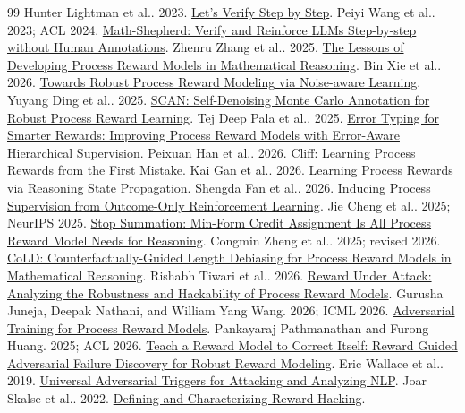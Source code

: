 \begin{thebibliography}{99}
\small
{} Hunter Lightman et al.. 2023. \href{https://arxiv.org/abs/2305.20050}{Let's Verify Step by Step}.
 Peiyi Wang et al.. 2023; ACL 2024. \href{https://arxiv.org/abs/2312.08935}{Math-Shepherd: Verify and Reinforce LLMs Step-by-step without Human Annotations}.
 Zhenru Zhang et al.. 2025. \href{https://arxiv.org/abs/2501.07301}{The Lessons of Developing Process Reward Models in Mathematical Reasoning}.
 Bin Xie et al.. 2026. \href{https://arxiv.org/abs/2601.12748}{Towards Robust Process Reward Modeling via Noise-aware Learning}.
 Yuyang Ding et al.. 2025. \href{https://arxiv.org/abs/2509.16548}{SCAN: Self-Denoising Monte Carlo Annotation for Robust Process Reward Learning}.
 Tej Deep Pala et al.. 2025. \href{https://arxiv.org/abs/2505.19706}{Error Typing for Smarter Rewards: Improving Process Reward Models with Error-Aware Hierarchical Supervision}.
 Peixuan Han et al.. 2026. \href{https://arxiv.org/abs/2609.02817}{Cliff: Learning Process Rewards from the First Mistake}.
 Kai Gan et al.. 2026. \href{https://arxiv.org/abs/2609.39220}{Learning Process Rewards via Reasoning State Propagation}.
 Shengda Fan et al.. 2026. \href{https://arxiv.org/abs/2609.36641}{Inducing Process Supervision from Outcome-Only Reinforcement Learning}.
 Jie Cheng et al.. 2025; NeurIPS 2025. \href{https://arxiv.org/abs/2504.15275}{Stop Summation: Min-Form Credit Assignment Is All Process Reward Model Needs for Reasoning}.
 Congmin Zheng et al.. 2025; revised 2026. \href{https://arxiv.org/abs/2507.15698}{CoLD: Counterfactually-Guided Length Debiasing for Process Reward Models in Mathematical Reasoning}.
 Rishabh Tiwari et al.. 2026. \href{https://arxiv.org/abs/2603.06621}{Reward Under Attack: Analyzing the Robustness and Hackability of Process Reward Models}.
 Gurusha Juneja, Deepak Nathani, and William Yang Wang. 2026; ICML 2026. \href{https://proceedings.mlr.press/v306/juneja26a.html}{Adversarial Training for Process Reward Models}.
 Pankayaraj Pathmanathan and Furong Huang. 2025; ACL 2026. \href{https://arxiv.org/abs/2507.06419}{Teach a Reward Model to Correct Itself: Reward Guided Adversarial Failure Discovery for Robust Reward Modeling}.
 Eric Wallace et al.. 2019. \href{https://arxiv.org/abs/1908.07125}{Universal Adversarial Triggers for Attacking and Analyzing NLP}.
 Joar Skalse et al.. 2022. \href{https://arxiv.org/abs/2209.13085}{Defining and Characterizing Reward Hacking}.

\end{thebibliography}
